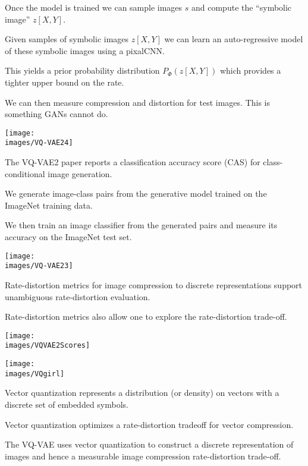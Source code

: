 {

Once the model is trained we can sample images $s$ and compute the ``symbolic image'' $z[X,Y]$.

\vfill
Given samples of symbolic images $z[X,Y]$ we can learn an auto-regressive model of these symbolic images using a pixalCNN.

\vfill
This yields a prior probability distribution $P_\Phi(z[X,Y])$ which provides a tighter upper bound on the rate.

\vfill
We can then measure compression and distortion for test images.  This is something GANs cannot do.

\centerline{\texttt{[image: \\images/VQ-VAE24]}}


The VQ-VAE2 paper reports a classification accuracy score (CAS) for class-conditional image generation.

\vfill
We generate image-class pairs from the generative model trained on the ImageNet training data.

\vfill
We then train an image classifier from the generated pairs and measure its accuracy on the ImageNet test set.

\vfill
\centerline{\texttt{[image: \\images/VQ-VAE23]}}


Rate-distortion metrics for image compression to discrete representations support unambiguous rate-distortion evaluation.

\vfill
Rate-distortion metrics also allow one to explore the rate-distortion trade-off.

\vfill
\centerline{\texttt{[image: \\images/VQVAE2Scores]}}


\vfill
\centerline{\texttt{[image: \\images/VQgirl]}}



Vector quantization represents a distribution (or density) on vectors with a discrete set of embedded symbols.

\vfill
Vector quantization optimizes a rate-distortion tradeoff for vector compression.

\vfill
The VQ-VAE uses vector quantization to construct a discrete representation of images and hence a measurable image compression rate-distortion trade-off.

}
